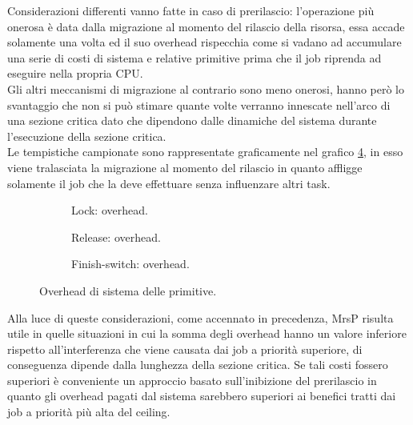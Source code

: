 \noindent Considerazioni differenti vanno fatte in caso di prerilascio: l'operazione più onerosa è data dalla migrazione al momento del rilascio della risorsa, essa accade solamente una volta ed il suo overhead rispecchia come si vadano ad accumulare una serie di costi di sistema e relative primitive prima che il job riprenda ad eseguire nella propria CPU.\\

\noindent Gli altri meccanismi di migrazione al contrario sono meno onerosi, hanno però lo svantaggio che non si può stimare quante volte verranno innescate nell'arco di una sezione critica dato che dipendono dalle dinamiche del sistema durante l'esecuzione della sezione critica.\\

\noindent Le tempistiche campionate sono rappresentate graficamente nel grafico \ref{fig:overheads}, in esso viene tralasciata la migrazione al momento del rilascio in quanto affligge solamente il job che la deve effettuare senza influenzare altri task.\\

  \begin{figure}
    \centering
      \begin{subfigure}[b]{0.49\textwidth}
        \centering
        \resizebox{\linewidth}{!}\overheadsLock
        \caption{Lock: overhead.}
        \label{fig:overheadsLock}
      \end{subfigure}
      \begin{subfigure}[b]{0.36\textwidth}
        \centering
        \resizebox{\linewidth}{!}\overheadsRelease
        \caption{Release: overhead.}
        \label{fig:overheadsUnlock}
      \end{subfigure}
      \begin{subfigure}[b]{0.49\textwidth}
        \centering
        \resizebox{\linewidth}{!}\overheadsFS
        \caption{Finish-switch: overhead.}
        \label{fig:overheadsFS}
      \end{subfigure}
    \caption{Overhead di sistema delle primitive.}
    \label{fig:overheads}
  \end{figure}

\noindent Alla luce di queste considerazioni, come accennato in precedenza, MrsP risulta utile in quelle situazioni in cui la somma degli overhead hanno un valore inferiore rispetto all'interferenza che viene causata dai job a priorità superiore, di conseguenza dipende dalla lunghezza della sezione critica. Se tali costi fossero superiori è conveniente un approccio basato sull'inibizione del prerilascio in quanto gli overhead pagati dal sistema sarebbero superiori ai benefici tratti dai job a priorità più alta del ceiling.

